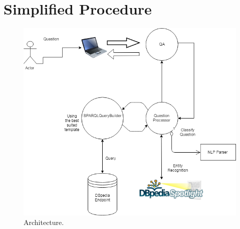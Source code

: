 \documentclass[runningheads]{llncs}
\begin{document}
\section{Simplified Procedure} 
\begin{figure}
	\includegraphics[width=\textwidth]{Architecture.PNG}
	
	\caption{Architecture.}
	\label{fig1} 
\end{figure}
\end{document}
